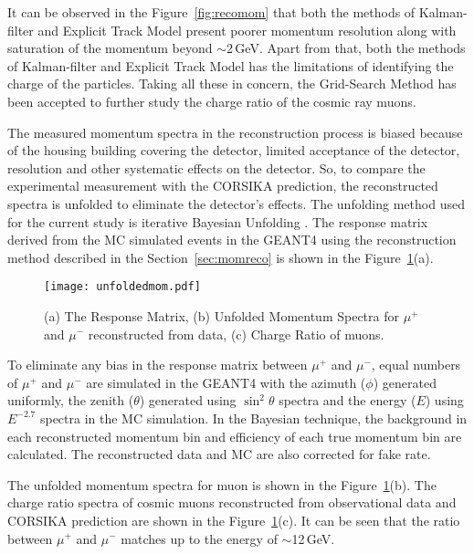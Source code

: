 It can be observed in the Figure~\ref{fig:recomom} that both the
methods of Kalman-filter and Explicit Track Model present poorer
momentum resolution along with saturation of the momentum beyond
$\sim$2\,GeV. Apart from that, both the methods of Kalman-filter
and Explicit Track Model has the limitations of identifying the
charge of the particles. Taking all these in concern, the Grid-Search
Method has been accepted to further study the charge ratio of the
cosmic ray muons.

The measured momentum spectra in the reconstruction process is biased
because of the housing building covering the detector, limited
acceptance of the detector, resolution and other systematic effects
on the detector. So, to compare the experimental measurement with the
CORSIKA prediction, the reconstructed spectra is unfolded to eliminate
the detector's effects.
The unfolding method used for the current study is iterative
Bayesian Unfolding \cite{bayesian}.
The response matrix derived from the MC simulated events in the
GEANT4 using the reconstruction method described in the
Section~\ref{sec:momreco} is shown in the
Figure~\ref{fig:unfolddata}(a).
\begin{figure}[h]
  \texttt{[image: unfoldedmom.pdf]}
  \caption{(a) The Response Matrix, (b) Unfolded Momentum Spectra for
    $\mu^{+}$ and $\mu^{-}$ reconstructed from data, (c) Charge Ratio
    of muons.}
  \label{fig:unfolddata}
\end{figure}
To eliminate any bias in the response matrix between $\mu^{+}$ and
$\mu^{-}$, equal numbers of $\mu^{+}$ and $\mu^{-}$ are simulated in
the GEANT4 with the azimuth ($\phi$) generated uniformly, the zenith
($\theta$) generated using $\sin^{2} \theta$ spectra and the energy
($E$) using $E^{-2.7}$ spectra in the MC simulation.
In the Bayesian technique, the background in each reconstructed
momentum bin and efficiency of each true momentum bin are calculated.
The reconstructed data and MC are also corrected for fake rate.

The unfolded momentum spectra for muon is shown in the
Figure~\ref{fig:unfolddata}(b). The charge ratio spectra of cosmic
muons reconstructed from observational data and CORSIKA prediction
are shown in the Figure~\ref{fig:unfolddata}(c). It can be seen that
the ratio between $\mu^{+}$ and $\mu^{-}$ matches up to the energy
of $\sim$12\,GeV.

